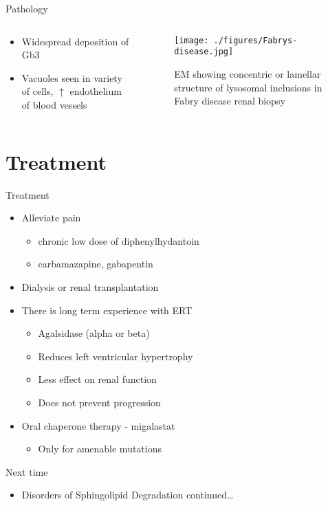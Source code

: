 \documentclass[presentation, smaller]{beamer}
\begin{document}
\begin{frame}[label={sec:orgheadline13}]{Pathology}
\begin{columns}
\begin{column}{0.5\columnwidth}
\begin{itemize}
\item Widespread deposition of Gb3
\item Vacuoles seen in variety of cells, \(\uparrow\) endothelium of blood vessels
\end{itemize}
\end{column}

\begin{column}{0.5\columnwidth}
\begin{figure}[htb]
\centering
\texttt{[image: ./figures/Fabrys-disease.jpg]}
\caption[em]{\label{fig:biopsy}
EM showing concentric or lamellar structure of lysosomal inclusions in Fabry disease renal biopsy}
\end{figure}
\end{column}
\end{columns}
\end{frame}


\section{Treatment}
\label{sec:orgheadline17}

\begin{frame}[label={sec:orgheadline15}]{Treatment}
\begin{itemize}
\item Alleviate pain
\begin{itemize}
\item chronic low dose of diphenylhydantoin
\item carbamazapine, gabapentin
\end{itemize}
\item Dialysis or renal transplantation
\item There is long term experience with ERT
\begin{itemize}
\item Agalsidase (alpha or beta)
\item Reduces left ventricular hypertrophy
\item Less effect on renal function
\item Does not prevent progression
\end{itemize}
\item Oral chaperone therapy - migalastat
\begin{itemize}
\item Only for amenable mutations
\end{itemize}
\end{itemize}
\end{frame}

\begin{frame}[label={sec:orgheadline16}]{Next time}
\begin{itemize}
\item Disorders of Sphingolipid Degradation continued\ldots{}
\end{itemize}
\end{frame}
\end{document}
